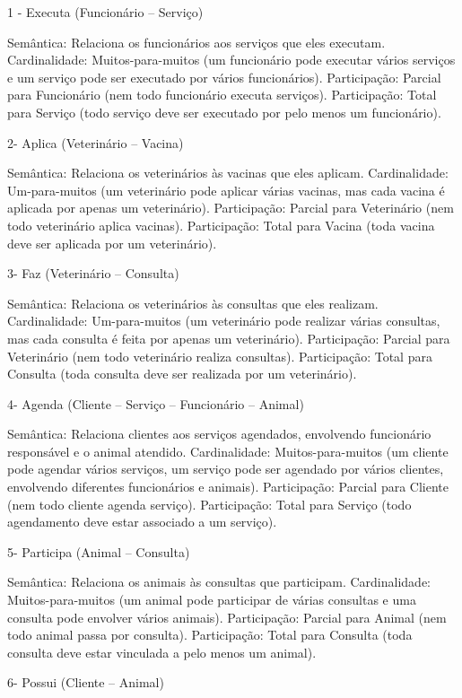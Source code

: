 \documentclass{article}
\begin{document}
 1 - Executa (Funcionário – Serviço) 

Semântica: Relaciona os funcionários aos serviços que eles executam. 
Cardinalidade: Muitos-para-muitos (um funcionário pode executar vários serviços e um serviço pode ser executado por vários funcionários). 
Participação: Parcial para Funcionário (nem todo funcionário executa serviços). 
Participação: Total para Serviço (todo serviço deve ser executado por pelo menos um funcionário). 

2- Aplica (Veterinário – Vacina) 

Semântica: Relaciona os veterinários às vacinas que eles aplicam. 
Cardinalidade: Um-para-muitos (um veterinário pode aplicar várias vacinas, mas cada vacina é aplicada por apenas um veterinário). 
Participação: Parcial para Veterinário (nem todo veterinário aplica vacinas). 
Participação: Total para Vacina (toda vacina deve ser aplicada por um veterinário). 

3- Faz (Veterinário – Consulta) 

Semântica: Relaciona os veterinários às consultas que eles realizam. 
Cardinalidade: Um-para-muitos (um veterinário pode realizar várias consultas, mas cada consulta é feita por apenas um veterinário). 
Participação: Parcial para Veterinário (nem todo veterinário realiza consultas). 
Participação: Total para Consulta (toda consulta deve ser realizada por um veterinário). 

4- Agenda (Cliente – Serviço – Funcionário – Animal) 

Semântica: Relaciona clientes aos serviços agendados, envolvendo funcionário responsável e o animal atendido. 
Cardinalidade: Muitos-para-muitos (um cliente pode agendar vários serviços, um serviço pode ser agendado por vários clientes, envolvendo diferentes funcionários e animais). 
Participação: Parcial para Cliente (nem todo cliente agenda serviço). 
Participação: Total para Serviço (todo agendamento deve estar associado a um serviço). 

5- Participa (Animal – Consulta) 

Semântica: Relaciona os animais às consultas que participam. 
Cardinalidade: Muitos-para-muitos (um animal pode participar de várias consultas e uma consulta pode envolver vários animais). 
Participação: Parcial para Animal (nem todo animal passa por consulta). 
Participação: Total para Consulta (toda consulta deve estar vinculada a pelo menos um animal). 

6- Possui (Cliente – Animal) 
\end{document}
